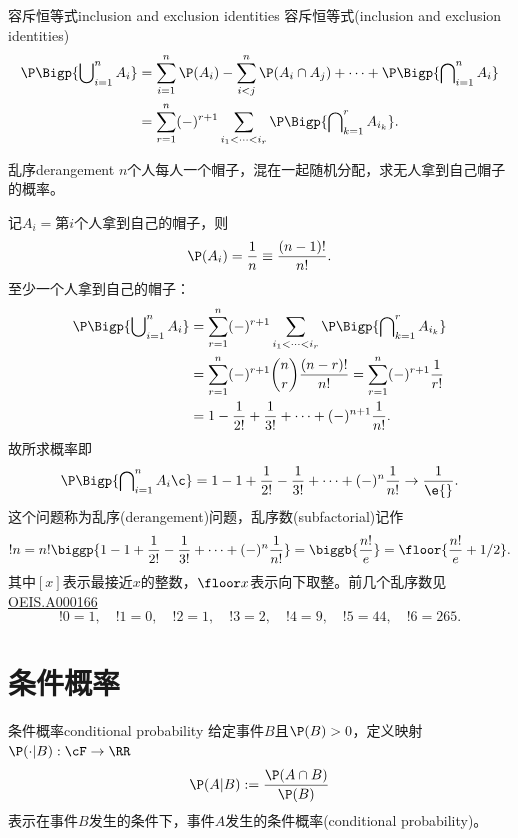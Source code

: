 \begin{theorem}{容斥恒等式}{inclusion and exclusion identities}
	容斥恒等式(inclusion and exclusion identities)
	\begin{align}\notag
		\P\Bigp{\bigcup\nolimits_{i=1}^nA_i}&=\sum_{i=1}^n\P(A_i)-\sum_{i<j}^n\P(A_i\cap A_j)+\cdots+\P\Bigp{\bigcap\nolimits_{i=1}^nA_i}\\
		&=\sum_{r=1}^n(-)^{r+1}\sum_{i_1<\cdots<i_r}\P\Bigp{\bigcap\nolimits_{k=1}^rA_{i_k}}.
	\end{align}
\end{theorem}
\begin{example}{乱序}{derangement}
	$n$个人每人一个帽子，混在一起随机分配，求无人拿到自己帽子的概率。

	记$A_i=$第$i$个人拿到自己的帽子，则
	\[
		\P(A_i)=\frac1n\equiv\frac{(n-1)!}{n!}.
	\]
	至少一个人拿到自己的帽子：
	\begin{align*}
		\P\Bigp{\bigcup\nolimits_{i=1}^nA_i}&=\sum_{r=1}^n(-)^{r+1}\sum_{i_1<\cdots<i_r}\P\Bigp{\bigcap\nolimits_{k=1}^rA_{i_k}}\\
		&=\sum_{r=1}^n(-)^{r+1}\binom nr\frac{(n-r)!}{n!}=\sum_{r=1}^n(-)^{r+1}\frac1{r!}\\
		&=1-\frac1{2!}+\frac1{3!}+\cdots+(-)^{n+1}\frac1{n!}.
	\end{align*}
	故所求概率即
	\[
		\P\Bigp{\bigcap\nolimits_{i=1}^nA_i\c}=1-1+\frac1{2!}-\frac1{3!}+\cdots+(-)^n\frac1{n!}\to\frac1{\e{}}.
	\]
	\tcblower
	这个问题称为乱序(derangement)问题，乱序数(subfactorial)记作
	\begin{equation}
		\label{eqn:subfactorial}
		!n=n!\biggp{1-1+\frac1{2!}-\frac1{3!}+\cdots+(-)^n\frac1{n!}}=\biggb{\frac{n!}e}=\floor{\frac{n!}e+1/2}.
	\end{equation}
	其中$[x]$表示最接近$x$的整数，$\floor x$表示向下取整。前几个乱序数见 \href{https://oeis.org/A000166}{OEIS.A000166}
	\[
		!0=1,\quad !1=0,\quad !2=1,\quad !3=2,\quad !4=9,\quad !5=44,\quad !6=265.%
	\]	
\end{example}

\section{条件概率}

\begin{definition}{条件概率}{conditional probability}
	给定事件$B$且$\P(B)>0$，定义映射$\P(\cdot|B):\cF\to\RR$
	\begin{equation}
		\P(A|B):=\frac{\P(A\cap B)}{\P(B)}
	\end{equation}
	表示在事件$B$发生的条件下，事件$A$发生的条件概率(conditional probability)。
\end{definition}


